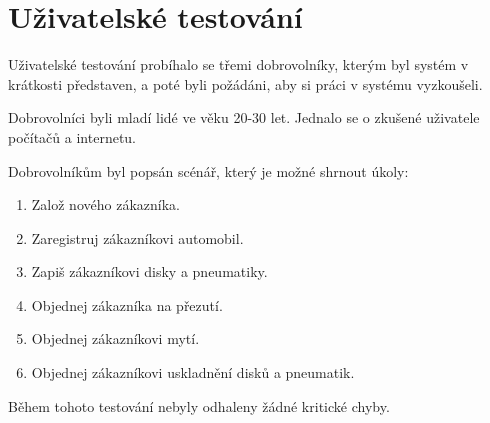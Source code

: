 \section{Uživatelské testování}
Uživatelské testování probíhalo se třemi dobrovolníky, kterým byl systém v krátkosti představen, a poté byli požádáni, aby si práci v systému vyzkoušeli. 

Dobrovolníci byli mladí lidé ve věku 20-30 let. Jednalo se o zkušené uživatele počítačů a internetu.

Dobrovolníkům byl popsán scénář, který je možné shrnout úkoly:
\begin{enumerate}
    \item Založ nového zákazníka.
    \item Zaregistruj zákazníkovi automobil.
    \item Zapiš zákazníkovi disky a pneumatiky.
    \item Objednej zákazníka na přezutí.
    \item Objednej zákazníkovi mytí.
    \item Objednej zákazníkovi uskladnění disků a pneumatik.
\end{enumerate}

Během tohoto testování nebyly odhaleny žádné kritické chyby.
